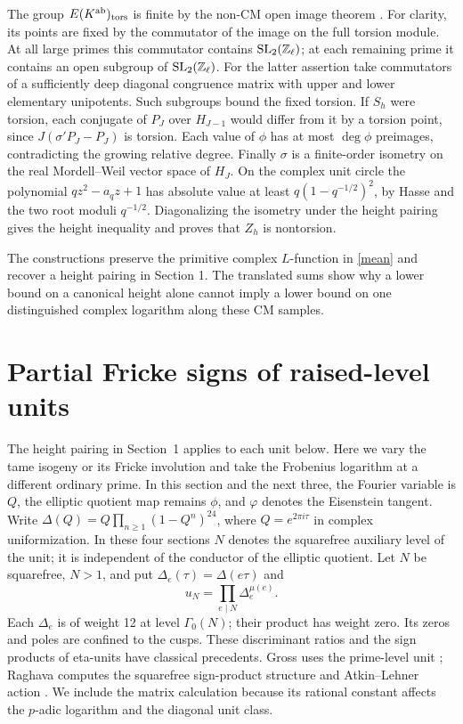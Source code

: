 \documentclass[11pt]{article}
\begin{document}
The group $E(K^{\rm ab})_{\rm tors}$ is finite by the non-CM open image theorem \cite{Serre}. For clarity, its points are fixed by the commutator of the image on the full torsion module. At all large primes this commutator contains $\mathrm{SL}_2(\mathbb Z_\ell)$; at each remaining prime it contains an open subgroup of $\mathrm{SL}_2(\mathbb Z_\ell)$. For the latter assertion take commutators of a sufficiently deep diagonal congruence matrix with upper and lower elementary unipotents. Such subgroups bound the fixed torsion. If $S_h$ were torsion, each conjugate of $P_J$ over $H_{J-1}$ would differ from it by a torsion point, since $J(\sigma' P_J-P_J)$ is torsion. Each value of $\phi$ has at most $\deg\phi$ preimages, contradicting the growing relative degree. Finally $\sigma$ is a finite-order isometry on the real Mordell--Weil vector space of $H_J$. On the complex unit circle the polynomial $qz^2-a_qz+1$ has absolute value at least $q(1-q^{-1/2})^2$, by Hasse and the two root moduli $q^{-1/2}$. Diagonalizing the isometry under the height pairing gives the height inequality and proves that $Z_h$ is nontorsion.

The constructions preserve the primitive complex $L$-function in \eqref{mean} and recover a height pairing in Section 1. The translated sums show why a lower bound on a canonical height alone cannot imply a lower bound on one distinguished complex logarithm along these CM samples.

\section{Partial Fricke signs of raised-level units}
The height pairing in Section~1 applies to each unit below. Here we vary the tame isogeny or its Fricke involution and take the Frobenius logarithm at a different ordinary prime. In this section and the next three, the Fourier variable is $Q$, the elliptic quotient map remains $\phi$, and $\varphi$ denotes the Eisenstein tangent. Write $\Delta(Q)=Q\prod_{n\ge1}(1-Q^n)^{24}$, where
$Q=e^{2\pi i\tau}$ in complex uniformization. In these four sections $N$ denotes the squarefree auxiliary level of the unit; it is independent of the conductor of the elliptic quotient. Let $N$ be squarefree,
$N>1$, and put $\Delta_e(\tau)=\Delta(e\tau)$ and
\[
             u_N=\prod_{e\mid N}\Delta_e^{\mu(e)} .
\]
Each $\Delta_e$ is of weight 12 at level $\Gamma_0(N)$; their product
has weight zero. Its zeros and poles are confined to the cusps.
These discriminant ratios and the sign products of eta-units have
classical precedents. Gross uses the prime-level unit \cite{Gross};
Raghava computes the squarefree sign-product structure and
Atkin--Lehner action \cite{Raghava}. We include the matrix calculation
because its rational constant affects the $p$-adic logarithm and
the diagonal unit class.
\end{document}
